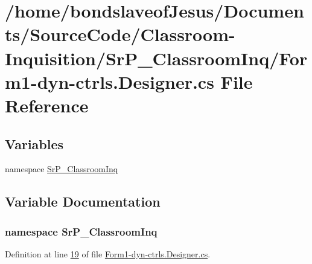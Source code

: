 \hypertarget{_form1-dyn-ctrls_8_designer_8cs}{
\section{/home/bondslaveof\-Jesus/\-Documents/\-Source\-Code/\-Classroom-\/\-Inquisition/\-Sr\-P\-\_\-\-Classroom\-Inq/\-Form1-\/dyn-\/ctrls.\-Designer.cs \-File \-Reference}
\label{_form1-dyn-ctrls_8_designer_8cs}
}
\subsection*{\-Variables}
\begin{DoxyCompactItemize}
\item 
﻿namespace \hyperlink{_form1-dyn-ctrls_8_designer_8cs_a5f2a2594873363876586b3e984e8838b}{\-Sr\-P\-\_\-\-Classroom\-Inq}
\end{DoxyCompactItemize}


\subsection{\-Variable \-Documentation}
\hypertarget{_form1-dyn-ctrls_8_designer_8cs_a5f2a2594873363876586b3e984e8838b}{
\subsubsection[{\-Sr\-P\-\_\-\-Classroom\-Inq}]{\setlength{\rightskip}{0pt plus 5cm}﻿namespace \-Sr\-P\-\_\-\-Classroom\-Inq}}
\label{_form1-dyn-ctrls_8_designer_8cs_a5f2a2594873363876586b3e984e8838b}


\-Definition at line \hyperlink{_form1-dyn-ctrls_8_designer_8cs_source_l00019}{19} of file \hyperlink{_form1-dyn-ctrls_8_designer_8cs_source}{\-Form1-\/dyn-\/ctrls.\-Designer.\-cs}.

